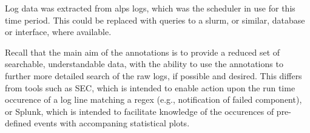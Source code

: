 Log data was extracted from alps logs, which was the scheduler in use for
this time period. This could be replaced with queries to a slurm,
or similar, database or interface, where available.

Recall that the main aim of the annotations
is to provide a reduced set of searchable, understandable data, with the
ability to use the annotations to further more detailed search of the raw
logs, if possible and desired. This differs from tools
such as SEC, which is intended to enable action upon the run time
occurence of a log line matching a regex (e.g., notification
of failed component), or Splunk, which is intended
to facilitate knowledge of the occurences of pre-defined
events with accompaning statistical plots.


